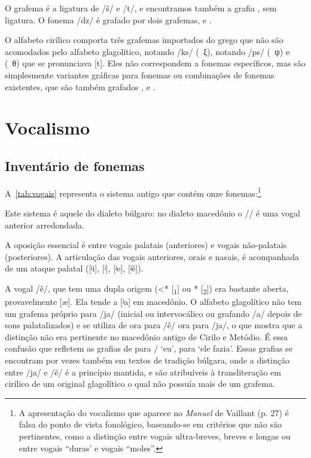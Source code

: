 O grafema  é a ligatura de /š/ e /t/, e encontramos também
a grafia , sem ligatura.
O fonema /dz/ é grafado por dois grafemas,  e
.

O alfabeto cirílico comporta três grafemas importados do grego que não são
acomodados pelo alfabeto glagolítico,  notando /ks/
(~ξ),  notando /ps/
(~ψ) e  (~θ) que se
pronunciava [t].
Eles não correspondem a fonemas específicos, mas são simplesmente variantes
gráficas para fonemas ou combinações de fonemas existentes, que são também
grafados ,  e
.

\section{Vocalismo}
\subsection{Inventário de fonemas}\label{sec:invvoc}

A~\autoref{tab:vogais} representa o sistema antigo que contém onze
fonemas:\footnote{%
	A apresentação do vocalismo que aparece no \emph{Manuel} de Vaillant (p. 27) é
	falsa do ponto de vista fonológico, baseando-se em critérios que não são
	pertinentes, como a distinção entre vogais ultra-breves, breves e longas ou
	entre vogais ``duras' e vogais ``moles''.\nocite{Vaillant1964}
}



Este sistema é aquele do dialeto búlgaro: no dialeto macedônio o /\jeru{}/
é uma vogal anterior arredondada.

A oposição essencial é entre vogais palatais (anteriores) e vogais
não-palatais (posteriores). A articulação das vogais anteriores, orais e nasais,
é acompanhada de um ataque palatal ([ʲi], [ʲ\jeri{}], [ʲe], [ʲě]).

A vogal /ě/, que tem uma dupla origem (<*
[\textsubscript{1}] ou * [\textsubscript{2}]) era
bastante aberta, provavelmente [æ].
Ela tende a [ʲa] em macedônio.
O alfabeto glagolítico não tem um grafema próprio para /ja/ (inicial ou
intervocálico ou grafando /a/ depois de sons palatalizados) e se utiliza de
 ora para /ě/ ora para /ja/, o que mostra que a distinção não
era pertinente no macedônio antigo de Cirilo e Metódio.
É essa confusão que refletem as grafias de  para
\slash{} `eu',  para
 `ele fazia'.
Essas grafias se encontram por vezes também em textos de tradição búlgara, onde
a distinção entre /ja/ e /ě/ é a princípio mantida, e são atribuíveis à
transliteração em cirílico de um original glagolítico o qual não possuía mais de
um grafema.

